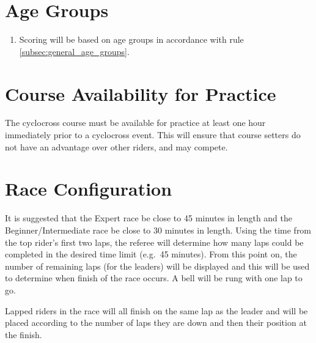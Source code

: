 \section{Age Groups}

\begin{enumerate}[leftmargin=1.5em,labelsep=*]
	\item Scoring will be based on age groups in accordance with rule \ref{subsec:general_age_groups}.
\end{enumerate}

\section{Course Availability for Practice}

The cyclocross course must be available for practice at least one hour immediately prior to a cyclocross event.
This will ensure that course setters do not have an advantage over other riders, and may compete.

\section{Race Configuration}

It is suggested that the Expert race be close to 45 minutes in length and the Beginner/Intermediate race be close to 30 minutes in length.
Using the time from the top rider's first two laps, the referee will determine how many laps could be completed in the desired time limit (e.g.\ 45 minutes).
From this point on, the number of remaining laps (for the leaders) will be displayed and this will be used to determine when finish of the race occurs.
A bell will be rung with one lap to go.

Lapped riders in the race will all finish on the same lap as the leader and will be placed according to the number of laps they are down and then their position at the finish.
